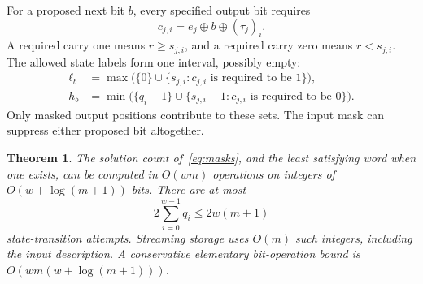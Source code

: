 \documentclass[11pt,a4paper]{article}
\newtheorem{theorem}{Theorem}
\begin{document}
For a proposed next bit $b$, every specified output bit requires
\begin{equation}\label{eq:required}
 c_{j,i}=e_j\oplus b\oplus (\tau_j)_i.
\end{equation}
A required carry one means $r\geq s_{j,i}$, and a required carry zero means
$r<s_{j,i}$. The allowed state labels form one interval, possibly empty:
\begin{equation}\label{eq:interval}
 \begin{aligned}
 \ell_b&=\max\bigl(\{0\}\cup\{s_{j,i}:c_{j,i}\text{ is required to be }1\}\bigr),\\
 h_b&=\min\bigl(\{q_i-1\}\cup\{s_{j,i}-1:c_{j,i}\text{ is required to be }0\}\bigr).
 \end{aligned}
\end{equation}
Only masked output positions contribute to these sets.
The input mask can suppress either proposed bit altogether.

\begin{theorem}\label{thm:count}
The solution count of~\eqref{eq:masks}, and the least satisfying word when
one exists, can be computed in $O(wm)$ operations on integers of
$O(w+\log(m+1))$ bits. There are at most
\begin{equation}\label{eq:attempts}
 2\sum_{i=0}^{w-1}q_i\leq2w(m+1)
\end{equation}
state-transition attempts. Streaming storage uses $O(m)$ such integers,
including the input description. A conservative elementary bit-operation
bound is $O(wm(w+\log(m+1)))$.
\end{theorem}
\end{document}
